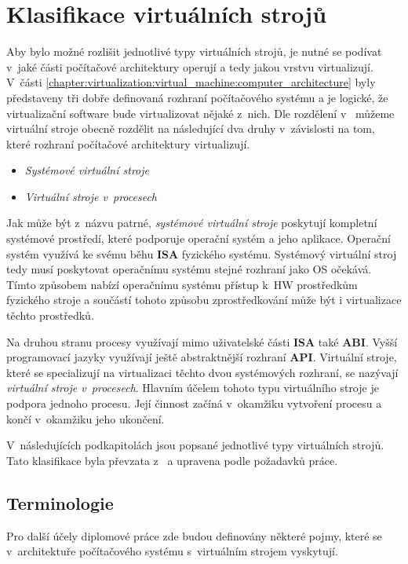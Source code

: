 \section{Klasifikace virtuálních strojů}
\label{chapter:virtualization:clasification}
Aby bylo možné rozlišit jednotlivé typy virtuálních strojů, je nutné se podívat v~jaké části počítačové architektury operují
a tedy jakou vrstvu virtualizují. V~části \ref{chapter:virtualization:virtual_machine:computer_architecture} byly představeny 
tři dobře definovaná rozhraní počítačového systému a je logické, že virtualizační software bude virtualizovat nějaké z~nich.
Dle rozdělení v~\cite{book:iee:vm_architecture} můžeme virtuální stroje obecně rozdělit na následující dva druhy v~závislosti
na tom, které rozhraní počítačové architektury virtualizují.
\begin{itemize}
  \item \textit{Systémové virtuální stroje}
  \item \textit{Virtuální stroje v~procesech}
\end{itemize}
Jak může být z~názvu patrné, \textit{systémové virtuální stroje} poskytují kompletní systémové prostředí, které podporuje
operační systém a jeho aplikace. Operační systém využívá ke svému běhu \textbf{ISA} fyzického systému. Systémový virtuální
stroj tedy musí poskytovat operačnímu systému stejné rozhraní jako OS očekává. Tímto způsobem nabízí operačnímu systému
přístup k~HW prostředkům fyzického stroje a součástí tohoto způsobu zprostředkování může být i virtualizace těchto prostředků.

Na druhou stranu procesy využívají mimo uživatelské části \textbf{ISA} také \textbf{ABI}. Vyšší programovací jazyky využívají
ještě abstraktnější rozhraní \textbf{API}. Virtuální stroje, které se specializují na virtualizaci těchto dvou systémových 
rozhraní, se nazývají \textit{virtuální stroje v~procesech}. Hlavním účelem tohoto typu virtuálního stroje je podpora jednoho
procesu. Její činnost začíná v~okamžiku vytvoření procesu a končí v~okamžiku jeho ukončení.

V~následujících podkapitolách jsou popsané jednotlivé typy virtuálních strojů. Tato klasifikace byla převzata z~\cite{book:iee:vm_architecture} a upravena podle požadavků práce.
\subsection{Terminologie}
\label{chapter:virtualization:clasification:terms}
Pro další účely diplomové práce zde budou definovány některé pojmy, které se v~architektuře počítačového systému s~virtuálním
strojem vyskytují. 


